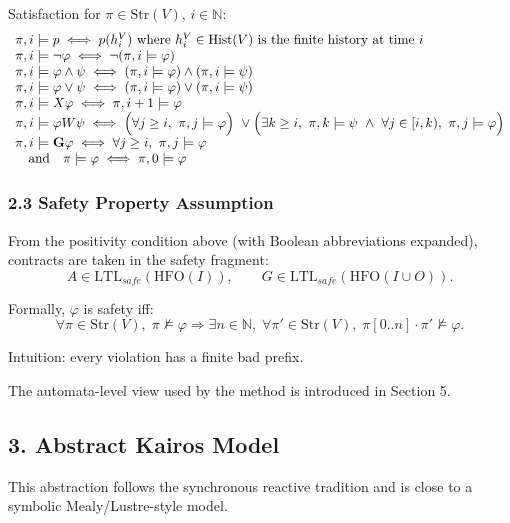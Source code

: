 \documentclass[
]{article}
\begin{document}
Satisfaction for \(\pi\in\mathrm{Str}(V)\), \(i\in\mathbb N\): \[
\begin{array}{l}
\pi,i \models p \iff p(h_i^V) \text{ where } h_i^V \in \mathrm{Hist}(V) \text{ is the finite history at time } i\\
\pi,i \models \neg\varphi \iff \neg(\pi,i\models\varphi)\\
\pi,i \models \varphi\land\psi \iff (\pi,i\models\varphi)\land(\pi,i\models\psi)\\
\pi,i \models \varphi\lor\psi \iff (\pi,i\models\varphi)\lor(\pi,i\models\psi)\\
\pi,i \models X\varphi \iff \pi,i+1\models\varphi\\
\pi,i \models \varphi W \psi \iff
\Bigl(\forall j\ge i,\ \pi,j\models\varphi\Bigr)\ \lor
\Bigl(\exists k\ge i,\ \pi,k\models\psi\ \land\ \forall j\in[i,k),\ \pi,j\models\varphi\Bigr)\\
\pi,i \models \mathbf{G}\varphi \iff \forall j\ge i,\ \pi,j\models\varphi\\
\quad\text{and}\quad
\pi\models\varphi \iff \pi,0\models\varphi
\end{array}
\]

\subsubsection{2.3 Safety Property
Assumption}\label{safety-property-assumption}

From the positivity condition above (with Boolean abbreviations
expanded), contracts are taken in the safety fragment: \[
A \in \mathrm{LTL}_{safe}(\mathrm{HFO}(I)),
\qquad
G \in \mathrm{LTL}_{safe}(\mathrm{HFO}(I\cup O)).
\]

Formally, \(\varphi\) is safety iff: \[
\forall \pi \in \mathrm{Str}(V),\;
\pi \not\models \varphi
\Rightarrow
\exists n\in\mathbb N,\;
\forall \pi' \in \mathrm{Str}(V),\;
\pi[0..n]\cdot \pi' \not\models \varphi.
\]

Intuition: every violation has a finite bad prefix.

The automata-level view used by the method is introduced in Section 5.

\subsection{3. Abstract Kairos Model}\label{abstract-kairos-model}

This abstraction follows the synchronous reactive tradition and is close
to a symbolic Mealy/Lustre-style model.
\end{document}
